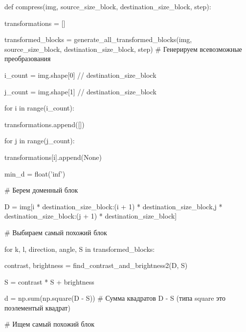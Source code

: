\documentclass{article}
\begin{document}
{
def compress(img, source\_size\_block, destination\_size\_block, step):

\hspace{1cm}		transformations = []

\hspace{1cm}		transformed\_blocks = generate\_all\_transformed\_blocks(img, source\_size\_block, destination\_size\_block, step) \# Генерируем всевозможные преобразования

\hspace{1cm}		i\_count = img.shape[0] // destination\_size\_block

\hspace{1cm}		j\_count = img.shape[1] // destination\_size\_block

\hspace{1cm}		for i in range(i\_count):

\hspace{2cm}			transformations.append([])

\hspace{2cm}			for j in range(j\_count):

\hspace{3cm}				transformations[i].append(None)

\hspace{3cm}				min\_d = float('inf')

\hspace{3cm}				\# Берем доменный блок

\hspace{3cm}				D = img[i * destination\_size\_block:(i + 1) * destination\_size\_block,j * destination\_size\_block:(j + 1) * destination\_size\_block]

\hspace{3cm}				\# Выбираем самый похожий блок

\hspace{3cm}				for k, l, direction, angle, S in transformed\_blocks:

\hspace{4cm}					contrast, brightness = find\_contrast\_and\_brightness2(D, S)

\hspace{1cm}					S = contrast * S + brightness

\hspace{4cm}				d = np.sum(np.square(D - S)) \# Сумма квадратов D - S (типа square это поэлементый квадрат)

\hspace{4cm}				\# Ищем самый похожий блок

}
\end{document}
